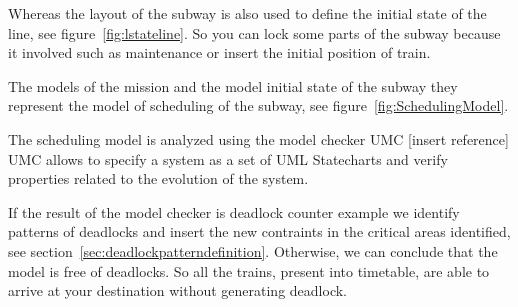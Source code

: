
Whereas the layout of the subway is also used to define the initial state of the line, see figure~\ref{fig:lstateline}. So you can lock some parts of the subway because it involved such as maintenance or insert the initial position of train.


The models of the mission and the model initial state of the subway they represent the model of scheduling of the subway, see figure~\ref{fig:SchedulingModel}.

The scheduling model is analyzed using the model checker UMC [insert reference]
UMC allows to specify a system as a set of UML Statecharts and verify properties related to the evolution of the system.


If the result of the model checker is deadlock counter example we identify patterns of deadlocks and insert the new contraints in the critical areas identified, see section~\ref{sec:deadlockpatterndefinition}. Otherwise, we can conclude that the model is free of deadlocks. 
So all the trains, present into timetable, are able to arrive at your destination without generating deadlock.